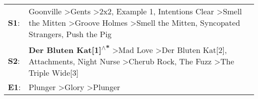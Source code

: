 \begin{supertabular}{p{0.03\textwidth}p{0.92\textwidth}}
 \textbf{S1}:  &  Goonville\textsuperscript{} \textgreater \enspace Gents\textsuperscript{} \textgreater \enspace 2x2\textsuperscript{}, \enspace Example 1\textsuperscript{}, \enspace Intentions Clear\textsuperscript{} \textgreater \enspace Smell the Mitten\textsuperscript{} \textgreater \enspace Groove Holmes\textsuperscript{} \textgreater \enspace Smell the Mitten\textsuperscript{}, \enspace Syncopated Strangers\textsuperscript{}, \enspace Push the Pig\textsuperscript{}  \enspace  \\
 \textbf{S2}:  &                                                                        \textbf{Der Bluten Kat[1]\textsuperscript{$\wedge$*}} \textgreater \enspace Mad Love\textsuperscript{} \textgreater \enspace Der Bluten Kat[2]\textsuperscript{}, \enspace Attachments\textsuperscript{}, \enspace Night Nurse\textsuperscript{} \textgreater \enspace Cherub Rock\textsuperscript{}, \enspace The Fuzz\textsuperscript{} \textgreater \enspace The Triple Wide[3]\textsuperscript{}  \enspace  \\
 \textbf{E1}:  &                                                                                                                                                                                                                                                                                                                                                     Plunger\textsuperscript{} \textgreater \enspace Glory\textsuperscript{} \textgreater \enspace Plunger\textsuperscript{}  \enspace  \\
\end{supertabular}
